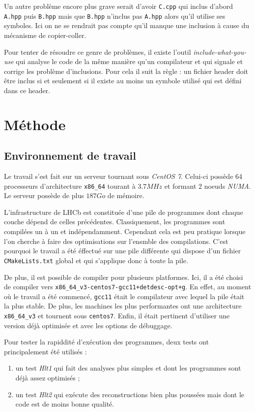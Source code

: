 \documentclass[a4paper]{report}
\begin{document}
            Un autre problème encore plus grave serait d'avoir \verb'C.cpp' qui inclus d'abord \verb'A.hpp' puis \verb'B.hpp' mais que \verb'B.hpp' n'inclus pas \verb'A.hpp' alors qu'il utilise ses symboles.
            Ici on ne se rendrait pas compte qu'il manque une inclusion à cause du mécanisme de copier-coller.

            Pour tenter de résoudre ce genre de problèmes, il existe l'outil \emph{include-what-you-use} qui analyse le code de la même manière qu'un compilateur et qui signale et corrige les problème d'inclusions.
            Pour cela il suit la règle : un fichier header doit être inclus si et seulement si il existe au moins un symbole utilisé qui est défini dans ce header.

\chapter{Méthode}
    \section{Environnement de travail}
        Le travail s'est fait sur un serveur tournant sous \emph{CentOS 7}.
        Celui-ci possède 64 processeurs d'architecture \verb'x86_64' tourant à $3.7 MHz$ et formant 2 noeuds \emph{NUMA}.
        Le serveur possède de plus $187 Go$ de mémoire.

        L'infrastructure de LHCb est constituée d'une pile de programmes dont chaque couche dépend de celles précédentes.
        Classiquement, les programmes sont compilées un à un et indépendamment.
        Cependant cela est peu pratique lorsque l'on cherche à faire des optimisations sur l'ensmble des compilations.
        C'est pourquoi le travail a été éffectué sur une pile différente qui dispose d'un fichier \verb'CMakeLists.txt' global et qui s'applique donc à toute la pile.

        De plus, il est possible de compiler pour plusieurs platformes.
        Ici, il a été choisi de compiler vers \verb'x86_64_v3-centos7-gcc11+detdesc-opt+g'.
        En effet, au moment où le travail a été commencé, \verb'gcc11' était le compilateur avec lequel la pile était la plus stable.
        De plus, les machines les plus performantes ont une architecture \verb'x86_64_v3' et tournent sous \verb'centos7'.
        Enfin, il était pertinent d'utiliser une version déjà optimisée et avec les options de débuggage.

        Pour tester la rapiddité d'exécution des programmes, deux tests ont principalement été utilisés :
        \begin{enumerate}
            \item un test \emph{Hlt1} qui fait des analyses plus simples et dont les programmes sont déjà assez optimisés ;
            \item un test \emph{Hlt2} qui exécute des reconstructions bien plus poussées mais dont le code est de moins bonne qualité.
        \end{enumerate}
\end{document}
